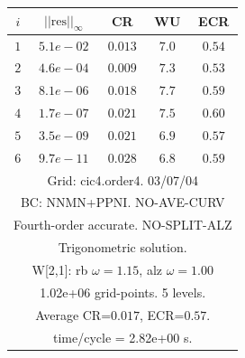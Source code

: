 \begin{table}[hbt]
\begin{center}
{\begin{tabular}{|c|c|c|c|c|}
 $i$   & $\vert\vert\mbox{res}\vert\vert_\infty$  &  CR     &  WU    & ECR  \\   \hline 
 $ 1$  & $ 5.1e-02$ & $0.013$ & $ 7.0$ & $0.54$ \\ 
 $ 2$  & $ 4.6e-04$ & $0.009$ & $ 7.3$ & $0.53$ \\ 
 $ 3$  & $ 8.1e-06$ & $0.018$ & $ 7.7$ & $0.59$ \\ 
 $ 4$  & $ 1.7e-07$ & $0.021$ & $ 7.5$ & $0.60$ \\ 
 $ 5$  & $ 3.5e-09$ & $0.021$ & $ 6.9$ & $0.57$ \\ 
 $ 6$  & $ 9.7e-11$ & $0.028$ & $ 6.8$ & $0.59$ \\ 
\hline 
\multicolumn{5}{|c|}{Grid: cic4.order4. 03/07/04}  \\
\multicolumn{5}{|c|}{BC: NNMN+PPNI. NO-AVE-CURV}  \\
\multicolumn{5}{|c|}{Fourth-order accurate. NO-SPLIT-ALZ}  \\
\multicolumn{5}{|c|}{Trigonometric solution.}  \\
\multicolumn{5}{|c|}{W[2,1]: rb $\omega=1.15$, alz $\omega=1.00$}  \\
\multicolumn{5}{|c|}{1.02e+06 grid-points. 5 levels.}  \\
\multicolumn{5}{|c|}{Average CR=$0.017$, ECR=$0.57$.}  \\
\multicolumn{5}{|c|}{time/cycle = 2.82e+00 s.}  \\
\hline 
\end{tabular}
}
\end{center}
\end{table}
